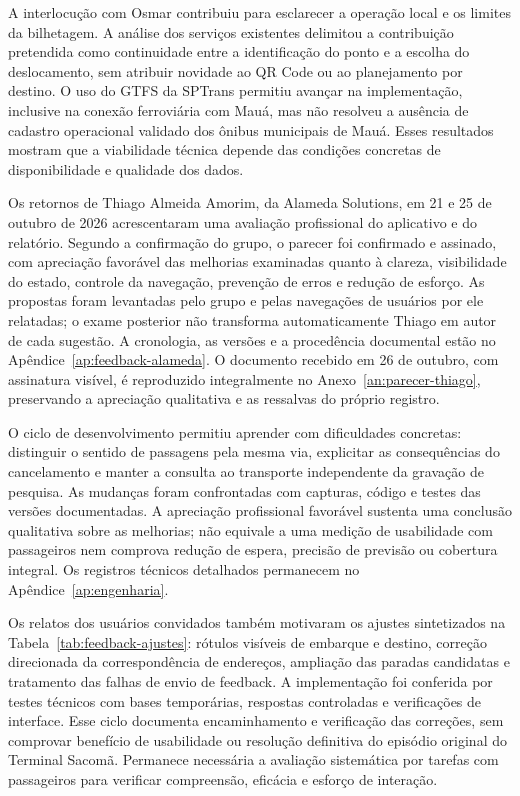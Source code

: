 \documentclass[12pt,oneside,a4paper,brazil,chapter=TITLE]{abntex2}
\begin{document}
A interlocução com Osmar contribuiu para esclarecer a operação local e os limites da bilhetagem. A análise dos serviços existentes delimitou a contribuição pretendida como continuidade entre a identificação do ponto e a escolha do deslocamento, sem atribuir novidade ao QR Code ou ao planejamento por destino. O uso do GTFS da SPTrans permitiu avançar na implementação, inclusive na conexão ferroviária com Mauá, mas não resolveu a ausência de cadastro operacional validado dos ônibus municipais de Mauá. Esses resultados mostram que a viabilidade técnica depende das condições concretas de disponibilidade e qualidade dos dados.

Os retornos de Thiago Almeida Amorim, da Alameda Solutions, em 21 e 25 de outubro de 2026 acrescentaram uma avaliação profissional do aplicativo e do relatório. Segundo a confirmação do grupo, o parecer foi confirmado e assinado, com apreciação favorável das melhorias examinadas quanto à clareza, visibilidade do estado, controle da navegação, prevenção de erros e redução de esforço. As propostas foram levantadas pelo grupo e pelas navegações de usuários por ele relatadas; o exame posterior não transforma automaticamente Thiago em autor de cada sugestão. A cronologia, as versões e a procedência documental estão no Apêndice~\ref{ap:feedback-alameda}. O documento recebido em 26 de outubro, com assinatura visível, é reproduzido integralmente no Anexo~\ref{an:parecer-thiago}, preservando a apreciação qualitativa e as ressalvas do próprio registro.

O ciclo de desenvolvimento permitiu aprender com dificuldades concretas: distinguir o sentido de passagens pela mesma via, explicitar as consequências do cancelamento e manter a consulta ao transporte independente da gravação de pesquisa. As mudanças foram confrontadas com capturas, código e testes das versões documentadas. A apreciação profissional favorável sustenta uma conclusão qualitativa sobre as melhorias; não equivale a uma medição de usabilidade com passageiros nem comprova redução de espera, precisão de previsão ou cobertura integral. Os registros técnicos detalhados permanecem no Apêndice~\ref{ap:engenharia}.

Os relatos dos usuários convidados também motivaram os ajustes sintetizados na Tabela~\ref{tab:feedback-ajustes}: rótulos visíveis de embarque e destino, correção direcionada da correspondência de endereços, ampliação das paradas candidatas e tratamento das falhas de envio de feedback. A implementação foi conferida por testes técnicos com bases temporárias, respostas controladas e verificações de interface. Esse ciclo documenta encaminhamento e verificação das correções, sem comprovar benefício de usabilidade ou resolução definitiva do episódio original do Terminal Sacomã. Permanece necessária a avaliação sistemática por tarefas com passageiros para verificar compreensão, eficácia e esforço de interação.
\end{document}
